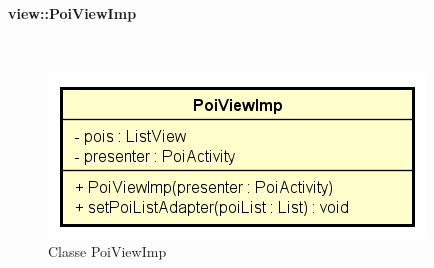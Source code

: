 \documentclass[../DefinizioneDiProdotto.tex]{subfiles}
\begin{document}
\paragraph{view::PoiViewImp}
\
\begin{figure}[H]
	\centering
	\includegraphics[width=\maxwidth]{img/PoiViewImp.png}
	\caption{Classe PoiViewImp}\label{fig:view::PoiViewImp} 
\end{figure}
\end{document}
